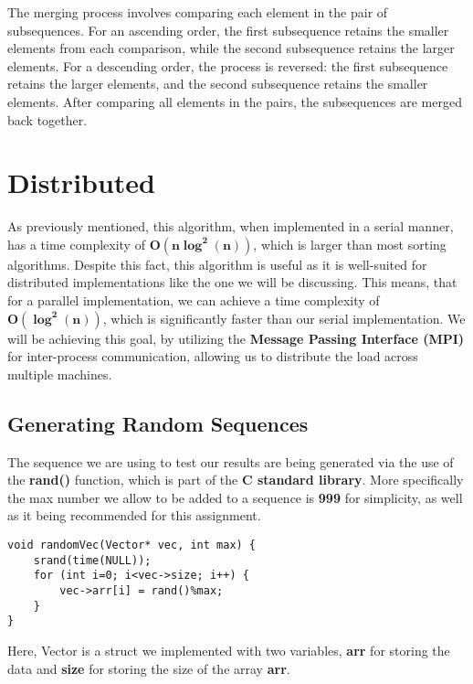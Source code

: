 \documentclass[12pt]{report}
\begin{document}
        The merging process involves comparing each element in the pair of subsequences. For an ascending order, the first subsequence retains the smaller elements from each comparison, while the second subsequence retains the larger elements. For a descending order, the process is reversed: the first subsequence retains the larger elements, and the second subsequence retains the smaller elements. After comparing all elements in the pairs, the subsequences are merged back together.
        
        
    \newpage
    \section{Distributed}
    As previously mentioned, this algorithm, when implemented in a serial manner, has a time complexity of \(\boldsymbol{O(n\log^2(n))}\), which is larger than most sorting algorithms. Despite this fact, this algorithm is useful as it is well-suited for distributed implementations like the one we will be discussing. This means, that for a parallel implementation, we can achieve a time complexity of \(\boldsymbol{O(\log^2(n))}\), which is significantly faster than our serial implementation. We will be achieving this goal, by utilizing the \textbf{Message Passing Interface (MPI)} for inter-process communication, allowing us to distribute the load across multiple machines.
    
        \subsection{Generating Random Sequences}
        The sequence we are using to test our results are being generated via the use of the \textbf{rand()} function, which is part of the \textbf{C standard library}. More specifically the max number we allow to be added to a sequence is \textbf{999} for simplicity, as well as it being recommended for this assignment.
        \begin{lstlisting}[style=cstyle]
void randomVec(Vector* vec, int max) {
    srand(time(NULL));
    for (int i=0; i<vec->size; i++) {
        vec->arr[i] = rand()%max;
    }
}
        \end{lstlisting}
        Here, Vector is a struct we implemented with two variables, \textbf{arr} for storing the data and \textbf{size} for storing the size of the array \textbf{arr}.
        
\end{document}
